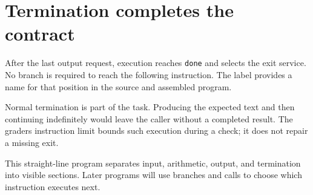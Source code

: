 \section{Termination completes the
  contract}\label{001-console-calculation-p19-termination-completes-the-contract}

After the last output request, execution reaches \texttt{done} and
selects the exit service. No branch is required to reach the following
instruction. The label provides a name for that position in the source
and assembled program.

Normal termination is part of the task. Producing the expected text and
then continuing indefinitely would leave the caller without a completed
result. The grader\textquotesingle s instruction limit bounds such
execution during a check; it does not repair a missing exit.

This straight-line program separates input, arithmetic, output, and
termination into visible sections. Later programs will use branches and
calls to choose which instruction executes next.
